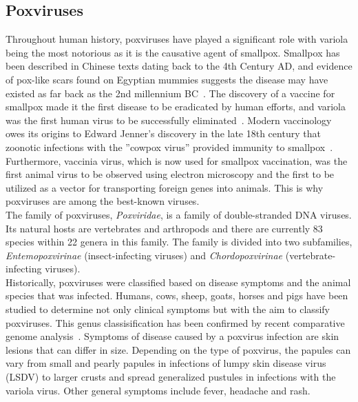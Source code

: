 \subsection{Poxviruses}
Throughout human history, poxviruses have played a significant role with variola being the most notorious as it is the causative agent of smallpox. Smallpox has been described in Chinese texts dating back to the 4th Century AD, and evidence of pox-like scars found on Egyptian mummies suggests the disease may have existed as far back as the 2nd millennium BC~\cite{fenner1988history}. The discovery of a vaccine for smallpox made it the first disease to be eradicated by human efforts, and variola was the first human virus to be successfully eliminated~\cite{fenner2000adventures}. Modern vaccinology owes its origins to Edward Jenner's discovery in the late 18th century that zoonotic infections with the ''cowpox virus'' provided immunity to smallpox~\cite{fenner1988history}. Furthermore, vaccinia virus, which is now used for smallpox vaccination, was the first animal virus to be observed using electron microscopy and the first to be utilized as a vector for transporting foreign genes into animals. This is why poxviruses are among the best-known viruses. \\
The family of poxviruses, \textit{Poxviridae}, is a family of double-stranded DNA viruses. Its natural hosts are vertebrates and arthropods and there are currently 83 species within 22 genera in this family. The family is divided into two subfamilies, \textit{Entemopoxvirinae} (insect-infecting viruses) and \textit{Chordopoxvirinae} (vertebrate-infecting viruses). \\
Historically, poxviruses were classified based on disease symptoms and the animal species that was infected. Humans, cows, sheep, goats, horses and pigs have been studied to determine not only clinical symptoms but with the aim to classify poxviruses. This genus classisification has been confirmed by recent comparative genome analysis~\cite{gubser2004poxvirus}. Symptoms of disease caused by a poxvirus infection are skin lesions that can differ in size. Depending on the type of poxvirus, the papules can vary from small and pearly papules in infections of lumpy skin disease virus (LSDV) to larger crusts and spread generalized pustules in infections with the variola virus. Other general symptoms include fever, headache and rash.

